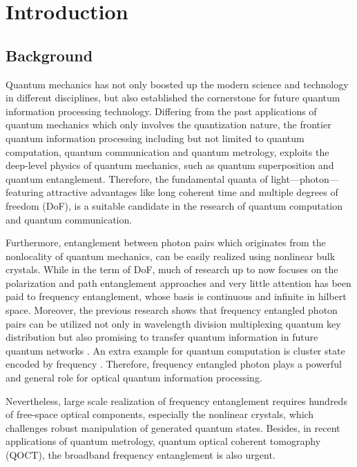 \chapter{Introduction}

\section{Background}

Quantum mechanics has not only boosted up the modern science and technology in different disciplines, but also established the cornerstone for future quantum information processing technology. 
Differing from the past applications of quantum mechanics which only involves the quantization nature, the frontier quantum information processing 
including but not limited to quantum computation, quantum communication and quantum metrology, 
exploits the deep-level physics of quantum mechanics, such as quantum superposition and quantum entanglement.
Therefore, the fundamental quanta of light---photon---featuring attractive advantages like long coherent time and multiple degrees of freedom (DoF), is a suitable candidate in the research of quantum computation and quantum communication. 

Furthermore, entanglement between photon pairs which originates from the nonlocality of quantum mechanics, can be easily realized using nonlinear bulk crystals. 
While in the term of DoF, much of research up to now focuses on the polarization and path entanglement approaches and very little attention has been paid to frequency entanglement, whose basis is continuous and infinite in hilbert space. 
Moreover, the previous research shows that frequency entangled photon pairs can be utilized not only in wavelength division multiplexing quantum key distribution \cite{Wengerowsky2018} but also promising to transfer quantum information in future quantum networks \cite{Tchebotareva2019}. 
An extra example for quantum computation is cluster state encoded by frequency \cites{Reimer2019}.
Therefore, frequency entangled photon plays a powerful and general role for optical quantum information processing.

Nevertheless, large scale realization of frequency entanglement requires hundreds of free-space optical components, especially the nonlinear crystals, which challenges robust manipulation of generated quantum states.
Besides, in recent applications of quantum metrology, quantum optical coherent tomography (QOCT), the broadband frequency entanglement \cite{Okano2015} is also urgent.

